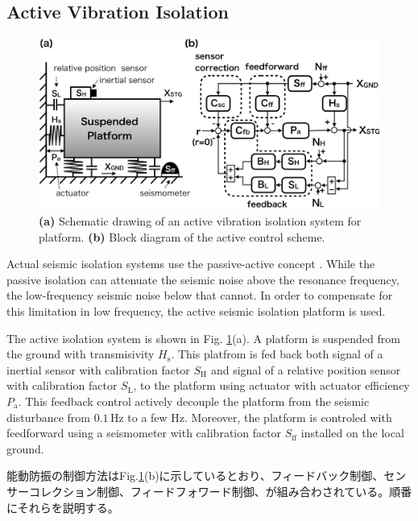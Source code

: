 \subsection{Active Vibration Isolation}
\begin{figure}[h]
  \begin{center}   
    \includegraphics[width=13.5cm]{./img_chap5/img503.png}
    \caption{{\bf(a)} Schematic drawing of an active vibration isolation system for platform. {\bf(b)} Block diagram of the active control scheme.} \label{img:img503}
  \end{center}
\end{figure}

Actual seismic isolation systems use the passive-active concept \cite{matichard2015seismic}. While the passive isolation can attenuate the seismic noise above the resonance frequency, the low-frequency seismic noise below that cannot. In order to compensate for this limitation in low frequency, the active seismic isolation platform is used.

The active isolation system is shown in Fig. \ref{img:img503}(a). A platform is suspended from the ground with transmisivity $H_{\mathrm{s}}$. This platfrom is fed back both signal of a inertial sensor with calibration factor $S_{\mathrm{H}}$ and signal of a relative position sensor with calibration factor $S_{\mathrm{L}}$, to the platform using actuator with actuator efficiency $P_{\mathrm{a}}$. This feedback control actively decouple the platform from the seismic disturbance from $0.1\,\mathrm{Hz}$ to a few Hz. Moreover, the platform is controled with feedforward using a seismometer with calibration factor $S_{\mathrm{ff}}$ installed on the local ground. 

能動防振の制御方法はFig.\ref{img:img503}(b)に示しているとおり、フィードバック制御、センサーコレクション制御、フィードフォワード制御、が組み合わされている。順番にそれらを説明する。

